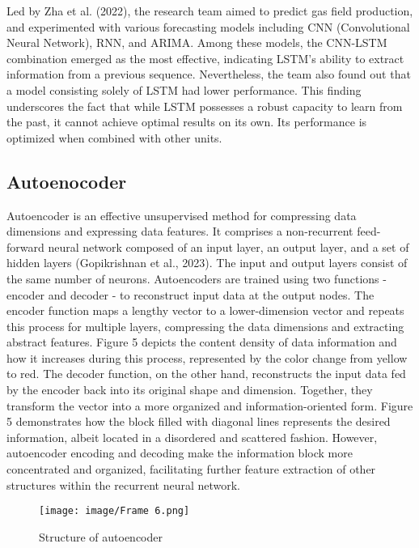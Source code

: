 \documentclass[sn-mathphys,Numbered]{sn-jnl}%
\theoremstyle{thmstyleone}%
\theoremstyle{thmstyletwo}%
\theoremstyle{thmstylethree}%
\begin{document}
 Led by Zha et al. (2022), the research team aimed to predict gas field production, and experimented with various forecasting models including CNN (Convolutional Neural Network), RNN, and ARIMA. Among these models, the CNN-LSTM combination emerged as the most effective, indicating LSTM's ability to extract information from a previous sequence. Nevertheless, the team also found out that a model consisting solely of LSTM had lower performance. This finding underscores the fact that while LSTM possesses a robust capacity to learn from the past, it cannot achieve optimal results on its own. Its performance is optimized when combined with other units.

\subsection{Autoenocoder}\label{subsec5}


Autoencoder is an effective unsupervised method for compressing data dimensions and expressing data features. It comprises a non-recurrent feed-forward neural network composed of an input layer, an output layer, and a set of hidden layers (Gopikrishnan et al., 2023). The input and output layers consist of the same number of neurons. Autoencoders are trained using two functions - encoder and decoder - to reconstruct input data at the output nodes. The encoder function maps a lengthy vector to a lower-dimension vector and repeats this process for multiple layers, compressing the data dimensions and extracting abstract features. Figure 5 depicts the content density of data information and how it increases during this process, represented by the color change from yellow to red. The decoder function, on the other hand, reconstructs the input data fed by the encoder back into its original shape and dimension. Together, they transform the vector into a more organized and information-oriented form. Figure 5 demonstrates how the block filled with diagonal lines represents the desired information, albeit located in a disordered and scattered fashion. However, autoencoder encoding and decoding make the information block more concentrated and organized, facilitating further feature extraction of other structures within the recurrent neural network. 

\begin{figure}[htp]
    \centering
    \texttt{[image: image/Frame 6.png]}
    \caption{\centering  Structure of autoencoder}
    \label{fig:autoencoder}
\end{figure}
\end{document}
